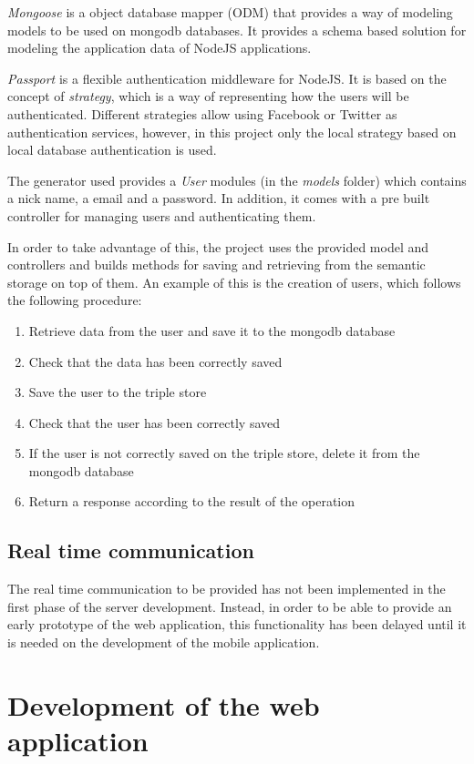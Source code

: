 \textit{Mongoose} is a object database mapper (ODM) that provides a way of modeling models to be used on mongodb databases. It provides a schema based solution for modeling the application data of NodeJS applications.

\textit{Passport} is a flexible authentication middleware for NodeJS. It is based on the concept of \textit{strategy}, which is a way of representing how the users will be authenticated. Different strategies allow using Facebook or Twitter as authentication services, however, in this project only the local strategy based on local database authentication is used.

The generator used provides a \textit{User} modules (in the \textit{models} folder) which contains a nick name, a email and a password. In addition, it comes with a pre built controller for managing users and authenticating them.

In order to take advantage of this, the project uses the provided model and controllers and builds methods for saving and retrieving from the semantic storage on top of them. An example of this is the creation of users, which follows the following procedure:

\begin{enumerate}
\item Retrieve data from the user and save it to the mongodb database
\item Check that the data has been correctly saved
\item Save the user to the triple store
\item Check that the user has been correctly saved
\item If the user is not correctly saved on the triple store, delete it from the mongodb database
\item Return a response according to the result of the operation
\end{enumerate}

\subsection{Real time communication}

The real time communication to be provided has not been implemented in the first phase of the server development. Instead, in order to be able to provide an early prototype of the web application, this functionality has been delayed until it is needed on the development of the mobile application. 

\section{Development of the web application}\label{sec:webappdev}

